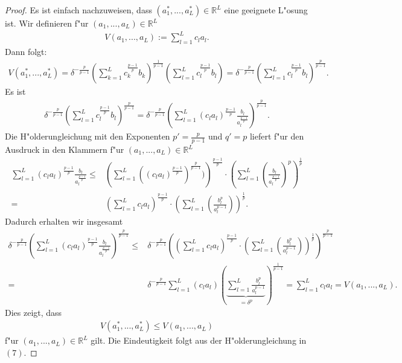 \begin{proof}
Es ist einfach nachzuweisen, dass $(a_1^*,...,a_L^*)\in\mathbb{R}^L$ eine geeignete L"osung ist. Wir definieren f"ur $(a_1,...,a_L)\in\mathbb{R}^L$
\begin{align*}
V(a_1,...,a_L):=\sum_{l=1}^L c_la_l.
\end{align*}
Dann folgt:
\begin{align*}
V(a_1^*,...,a_L^*)=\delta^{-\frac{p}{p-1}}\left(\sum_{k=1}^L c_k^{\frac{p-1}{p}}b_k\right)^{\frac{1}{p-1}}\left(\sum_{l=1}^L c_l^{\frac{p-1}{p}}b_l\right)=\delta^{-\frac{p}{p-1}}\left(\sum_{l=1}^L c_l^{\frac{p-1}{p}}b_l\right)^{\frac{p}{p-1}}.
\end{align*}
Es ist
\begin{align*}
\delta^{-\frac{p}{p-1}}\left(\sum_{l=1}^L c_l^{\frac{p-1}{p}}b_l\right)^{\frac{p}{p-1}}=\delta^{-\frac{p}{p-1}}\left(\sum_{l=1}^L(c_la_l)^{\frac{p-1}{p}}\frac{b_l}{a_l^{\frac{p-1}{p}}}\right)^{\frac{p}{p-1}}.
\end{align*} 
Die H"olderungleichung mit den Exponenten $p'=\frac{p}{p-1}$ und $q'=p$ liefert f"ur den Ausdruck in den Klammern f"ur  $(a_1,...,a_L)\in\mathbb{R}^L$
\begin{align}
\sum_{l=1}^L(c_la_l)^{\frac{p-1}{p}}\frac{b_l}{a_l^{\frac{p-1}{p}}}\leq& \left(\sum_{l=1}^L((c_la_l)^{\frac{p-1}{p}})^{\frac{p}{p-1}})\right)^{\frac{p-1}{p}}\cdot \left(\sum_{l=1}^L\left(\frac{b_l}{a_l^{\frac{p-1}{p}}}\right)^p\right)^{\frac{1}{p}}\\
=&\left(\sum_{l=1}^L c_la_l\right)^{\frac{p-1}{p}}\cdot \left(\sum_{l=1}^L\left(\frac{b_l^p}{a_l^{p-1}}\right)\right)^{\frac{1}{p}}.
\end{align}
Dadurch erhalten wir insgesamt
\begin{align*}
\delta^{-\frac{p}{p-1}}\left(\sum_{l=1}^L(c_la_l)^{\frac{p-1}{p}}\frac{b_l}{a_l^{\frac{p-1}{p}}}\right)^{\frac{p}{p-1}}
\leq& \delta^{-\frac{p}{p-1}}\left(\left(\sum_{l=1}^L c_la_l\right)^{\frac{p-1}{p}}\cdot \left(\sum_{l=1}^L\left(\frac{b_l^p}{a_l^{p-1}}\right)\right)^{\frac{1}{p}}\right)^{\frac{p}{p-1}}\\
=&\delta^{-\frac{p}{p-1}}\sum_{l=1}^L(c_la_l)\left(\underbrace{\sum_{l=1}^L\frac{b_l^p}{a_l^{p-1}}}_{=\delta^p}\right)^{\frac{1}{p-1}}=\sum_{l=1}^L c_la_l=V(a_1,...,a_L).
\end{align*}
Dies zeigt, dass 
\begin{align*}
V(a_1^*,...,a_L^*)\leq V(a_1,...,a_L)
\end{align*}
f"ur $(a_1,...,a_L)\in\mathbb{R}^L$ gilt. Die Eindeutigkeit folgt aus der H"olderungleichung in $(7)$.
\end{proof}
